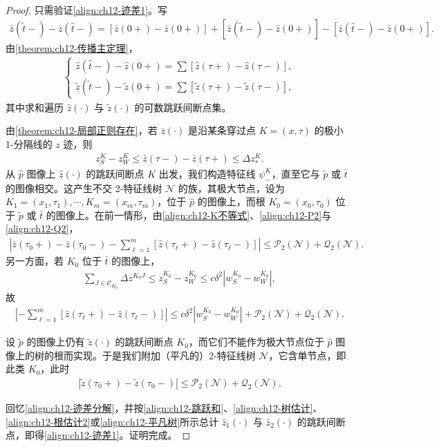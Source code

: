 \documentclass[../../main.tex]{subfiles}
\begin{document}
\begin{proof}
只需验证\eqref{align:ch12-迹差1}。写
\begin{align}
\bar z(\tilde t-)-\bar z(\hat t-)=[\bar z(0+)-\bar z(0+)]+[\bar z(\tilde t-)-\bar z(0+)]-[\bar z(\hat t-)-\bar z(0+)].
\label{align:ch12-迹差分解}
\end{align}
由\cref{theorem:ch12-传播主定理}，
\begin{align}
\begin{cases}
\hat z(\hat t-)-\hat z(0+)=\sum[\hat z(\tau+)-\hat z(\tau-)],\\
\tilde z(\tilde t-)-\tilde z(0+)=\sum[\tilde z(\tau+)-\tilde z(\tau-)],
\end{cases}
\label{align:ch12-跳跃和}
\end{align}
其中求和遍历 $\hat z(\cdot)$ 与 $\tilde z(\cdot)$ 的可数跳跃间断点集。

由\cref{theorem:ch12-局部正则存在}，若 $\bar z(\cdot)$ 是沿某条穿过点 $K=(x,\tau)$ 的极小 1-分隔线的 $z$ 迹，则
\begin{align}
z_S^K-z_W^K\leqslant\bar z(\tau-)-\bar z(\tau+)\leqslant\Delta z_*^K.
\label{align:ch12-K不等式}
\end{align}
从 $\hat p$ 图像上 $\hat z(\cdot)$ 的跳跃间断点 $K$ 出发，我们构造特征线 $\psi_-^K$，直至它与 $\tilde p$ 或 $\bar t$ 的图像相交。这产生不交 2-特征线树 $\mathscr{N}$ 的族，其极大节点，设为 $K_1=(x_1,\tau_1),\cdots,K_m=(x_m,\tau_m)$，位于 $\hat p$ 的图像上，而根 $K_0=(x_0,\tau_0)$ 位于 $\tilde p$ 或 $\bar t$ 的图像上。在前一情形，由\eqref{align:ch12-K不等式}、\eqref{align:ch12-P2}与\eqref{align:ch12-Q2}，
\begin{align}
|\bar z(\tau_0+)-\bar z(\tau_0-)-\sum_{\ell=1}^m[\hat z(\tau_\ell+)-\hat z(\tau_\ell-)]|\leqslant\mathscr{P}_2(\mathscr{N})+\mathscr{Q}_2(\mathscr{N}).
\label{align:ch12-树估计}
\end{align}
另一方面，若 $K_0$ 位于 $\bar t$ 的图像上，
\begin{align}
\sum_{J\in\mathscr{C}_{K_0}}\Delta z^{K_0J}\leqslant z_S^{K_0}-z_W^{K_0}\leqslant c\delta^2|w_S^{K_0}-w_W^{K_0}|,
\label{align:ch12-根估计}
\end{align}
故
\begin{align}
\left|-\sum_{\ell=1}^m[\hat z(\tau_\ell+)-\hat z(\tau_\ell-)]\right|\leqslant c\delta^2|w_S^{K_0}-w_W^{K_0}|+\mathscr{P}_2(\mathscr{N})+\mathscr{Q}_2(\mathscr{N}).
\label{align:ch12-根估计2}
\end{align}

设 $\tilde p$ 的图像上仍有 $\tilde z(\cdot)$ 的跳跃间断点 $K_0$，而它们不能作为极大节点位于 $\hat p$ 图像上的树的根而实现。于是我们附加（平凡的）2-特征线树 $\mathscr{N}$，它含单节点，即此类 $K_0$，此时
\begin{align}
|\tilde z(\tau_0+)-\tilde z(\tau_0-)|\leqslant\mathscr{P}_2(\mathscr{N})+\mathscr{Q}_2(\mathscr{N}).
\label{align:ch12-平凡树}
\end{align}

回忆\eqref{align:ch12-迹差分解}，并按\eqref{align:ch12-跳跃和}、\eqref{align:ch12-树估计}、\eqref{align:ch12-根估计2}或\eqref{align:ch12-平凡树}所示总计 $\bar z_1(\cdot)$ 与 $\bar z_2(\cdot)$ 的跳跃间断点，即得\eqref{align:ch12-迹差1}。证明完成。
\end{proof}
\end{document}
